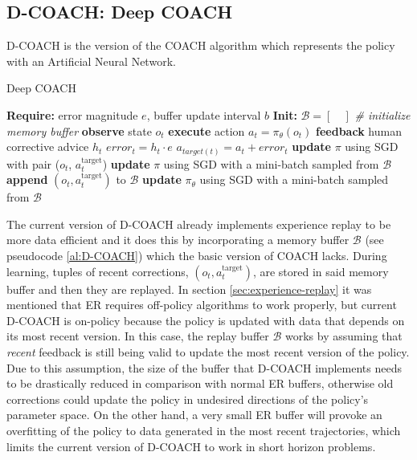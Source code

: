 \subsection{D-COACH: Deep COACH}
\label{subsection:D-COACH}


D-COACH \cite{ResearchAssignmentpaper} is the  version of the COACH algorithm which represents the policy with an Artificial Neural Network.

\begin{algorithm}[H]
\caption{Deep COACH}\label{algorithm:DeepCOACH}
\begin{algorithmic}[1]
\State \textbf{Require:} error magnitude $e$, buffer update interval $b$
\State \textbf{Init:} $\mathcal{B} = [\quad]$  \emph{\# initialize memory buffer}
\State \textbf{observe} state $o_{t}$
\State \textbf{execute} action $a_{t}=\pi_{\theta}(o_{t})$
\State \textbf{feedback} human corrective advice $h_{t}$
\State $\mathit{error}_{t} = h_{t}\cdot e$
\State $a_{target(t)} = a_{t} + \mathit{error}_{t}$
\State \textbf{update} $\pi$ using SGD with pair ($o_{t}$, $a^{\text{target}}_{t}$)
\State \textbf{update} $\pi$ using SGD with a mini-batch sampled from $\mathcal{B}$
\State \textbf{append} $(o_{t}, a^{\text{target}}_{t})$ to $\mathcal{B}$
\EndIf
{}
\State \textbf{update} $\pi_{\theta}$ using SGD with a mini-batch sampled from $\mathcal{B}$
\EndIf
\EndFor
\end{algorithmic}
\label{al:D-COACH}
\end{algorithm}

The current version of D-COACH already implements experience replay to be more data efficient and it does this by incorporating a memory buffer $\mathcal{B}$ (see pseudocode \ref{al:D-COACH}) which the basic version of COACH lacks. During learning, tuples of recent corrections, $(o_t, a^{\text{target}}_t)$, are stored in said memory buffer and then they are replayed. In section \ref{sec:experience-replay} it was mentioned that ER requires off-policy algorithms to work properly, but current D-COACH is on-policy because the policy is updated with data that depends on its most recent version. In this case, the replay buffer $\mathcal{B}$ works by assuming that \textit{recent} feedback is still being valid to update the most recent version of the policy. Due to this assumption, the size of the buffer that D-COACH implements needs to be drastically reduced in comparison with normal ER buffers, otherwise old corrections could update the policy in undesired directions of the policy’s parameter space. On the other hand, a very small ER buffer will provoke an  overfitting of the policy to data generated in the most recent trajectories, which limits the current version of D-COACH to work in short horizon problems.



